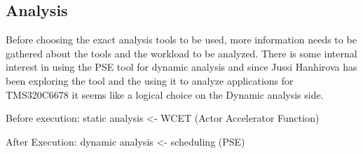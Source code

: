 \subsection{Analysis}
Before choosing the exact analysis tools to be used, more information needs to be gathered about the tools and the workload to be analyzed. There is some internal interest in using the PSE tool for dynamic analysis and since Jussi Hanhirova has been exploring the tool and the using it to analyze applications for TMS320C6678 it seems like a logical choice on the Dynamic analysis side.

Before execution: static analysis <- WCET (Actor Accelerator Function)

After Execution: dynamic analysis <- scheduling (PSE)
